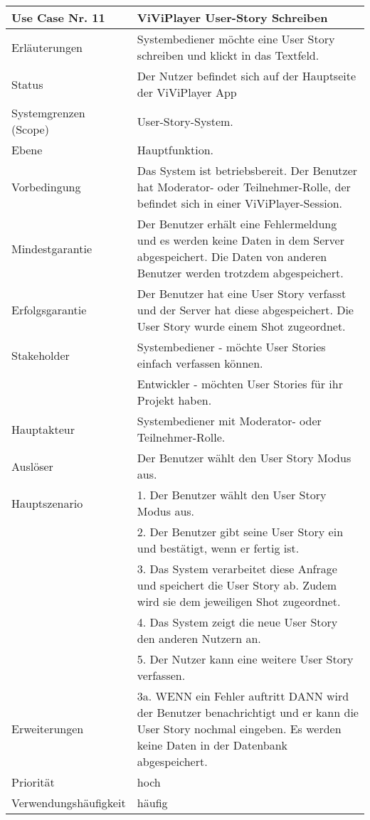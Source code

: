 \begin{tabularx}{\linewidth}{|l|X|}
	\hline
	Use Case Nr. 11			&  \textbf{ViViPlayer User-Story Schreiben} \\ \hline
	Erläuterungen			&  Systembediener möchte eine User Story schreiben und klickt in 
							   das Textfeld. \\ \hline
	Status					&  Der Nutzer befindet sich auf der Hauptseite der ViViPlayer App 
							   \\ \hline
	Systemgrenzen (Scope)	&  User-Story-System. \\ \hline
	Ebene					&  Hauptfunktion. \\ \hline
	Vorbedingung			&  Das System ist betriebsbereit. Der Benutzer hat Moderator- oder 
							   Teilnehmer-Rolle, der befindet sich in einer ViViPlayer-Session. \\ \hline
	Mindestgarantie			&  Der Benutzer erhält eine Fehlermeldung und es werden keine Daten 
							   in dem Server abgespeichert. Die Daten von anderen Benutzer werden trotzdem abgespeichert. \\ \hline
	Erfolgsgarantie			&  Der Benutzer hat eine User Story verfasst und der Server hat
							   diese abgespeichert. Die User Story wurde einem Shot
							   zugeordnet.\\ \hline
	Stakeholder				&  Systembediener - möchte User Stories einfach verfassen können.\\ 
                            &  Entwickler - möchten User Stories für ihr Projekt haben. \\ 
                               \hline
	Hauptakteur				&  Systembediener mit Moderator- oder Teilnehmer-Rolle. \\ \hline
	Auslöser				&  Der Benutzer wählt den User Story Modus aus. \\ \hline	
	Hauptszenario			&  1. Der Benutzer wählt den User Story Modus aus. \\
                            &  2. Der Benutzer gibt seine User Story ein und bestätigt, wenn er 
                               fertig ist. \\
							&  3. Das System verarbeitet diese Anfrage und speichert die User 
							   Story ab. Zudem wird sie dem jeweiligen Shot zugeordnet. \\
							&  4. Das System zeigt die neue User Story den anderen Nutzern an.\\
							&  5. Der Nutzer kann eine weitere User Story verfassen. \\ \hline
	Erweiterungen			& 3a. WENN ein Fehler auftritt DANN wird der Benutzer 
	                          benachrichtigt und er kann die User Story nochmal eingeben. Es werden keine Daten in der Datenbank abgespeichert. \\ \hline
	Priorität				&  hoch \\ \hline
	Verwendungshäufigkeit	&  häufig \\ \hline
\end{tabularx}
